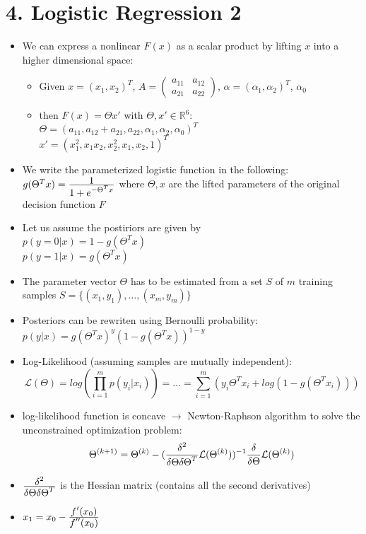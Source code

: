 \section*{4. Logistic Regression 2}
\begin{itemize}
    \item
        We can express a nonlinear $F(x)$ as a scalar product by lifting $x$ into a higher dimensional space:
        \begin{itemize}
            \item
                Given $x = (x_1, x_2)^T$, $A = \begin{pmatrix} a_{11} & a_{12}\\ a_{21} & a_{22} \end{pmatrix}$, $\alpha = (\alpha_1, \alpha_2)^T$, $\alpha_0$
            \item
                then $F(x) = \Theta x'$ with $\Theta, x' \in \mathbb{R}^6$:\\
                $\Theta = (a_{11}, a_{12} + a_{21}, a_{22}, \alpha_1, \alpha_2, \alpha_0)^T$\\
                $x' = (x_1^2, x_1x_2, x_2^2, x_1, x_2, 1)^T$
        \end{itemize}
    \item
        We write the parameterized logistic function in the following: $g(\Theta^T x) = \frac{\displaystyle 1}{\displaystyle 1+e^{-\Theta^T x}}$ where $\Theta, x$ are the lifted parameters of the original decision function $F$\\
    \item
        Let us assume the postiriors are given by \\
        $p(y=0|x) = 1 - g(\Theta^T x)$ \\
        $p(y=1|x) = g(\Theta^T x)$
    \item
        The parameter vector $\Theta$ has to be estimated from a set $S$ of $m$ training samples $S=\{(x_1, y_1), \dots, (x_m, y_m)\}$
    \item
        Posteriors can be rewriten using Bernoulli probability: $p(y|x) = g(\Theta^T x)^y (1- g(\Theta^T x))^{1-y}$
    \item
        Log-Likelihood (assuming samples are mutually independent):\\
        $$\mathcal{L}(\Theta) = log(\prod_{i=1}^{m} p(y_i|x_i)) = \dots = \sum_{i=1}^{m}(y_i \Theta^T x_i + log(1-g(\Theta^T x_i)))$$
    \item
        log-likelihood function is concave $\rightarrow$ Newton-Raphson algorithm to solve the unconstrained optimization problem:\\
        $$\Theta^{(k+1)} = \Theta^{(k)} - (\frac{\displaystyle \delta^2}{\displaystyle \delta \Theta \delta \Theta^T} \mathcal{L}(\Theta^{(k)}))^{-1}\frac{\displaystyle \delta}{\displaystyle \delta \Theta} \mathcal{L}(\Theta^{(k)})$$
    \item
        $\frac{\displaystyle \delta^2}{\displaystyle \delta \Theta \delta \Theta^T}$ is the Hessian matrix (contains all the second derivatives)
    \item
        $x_1 = x_0 - \frac{\displaystyle f'(x_0)}{\displaystyle f''(x_0)}$ 
\end{itemize}

